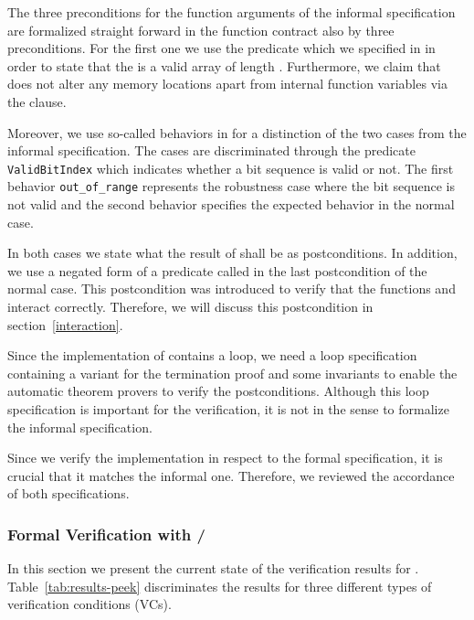 The three preconditions for the function arguments of the informal specification 
are formalized straight forward in the function contract also by three preconditions.
For the first one we use the predicate 
which we specified in \acsl in order to state that the 
is a valid array of length .
Furthermore, we claim that \peek does not alter any memory locations
apart from internal function variables via the  clause.

Moreover, we use so-called behaviors in \acsl for a distinction of the two cases
from the informal specification.
The cases are discriminated through the predicate \texttt{ValidBitIndex}
which indicates whether a bit sequence is valid or not.
The first behavior \texttt{out\_of\_range} represents the robustness 
case where the bit sequence is not valid and 
the second behavior specifies the expected behavior in the normal case.

In both cases we state what the result of \peek shall be 
as postconditions. In addition, we use a negated form of
a predicate called  in the last postcondition of
the normal case. This postcondition was introduced to verify
that the functions \peek and \poke interact correctly.
Therefore, we will discuss this postcondition in section~\ref{interaction}.

Since the implementation of \peek contains a loop,
we need a loop specification containing a variant for the termination
proof and some invariants to enable the automatic theorem provers
to verify the postconditions.
Although this loop specification is important for the verification,
it is not in the sense to formalize the informal specification.

Since we verify the implementation in respect to the formal specification, 
it is crucial that it matches the informal one. 
Therefore, we reviewed the accordance of both specifications.

\FloatBarrier

\subsubsection{Formal Verification with \framac/\wpframac}
\label{verification-peek}

In this section we present the current state of the verification results 
for \peek.
Table~\ref{tab:results-peek} discriminates the results for
three different types of verification conditions (VCs).

